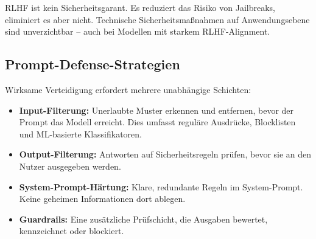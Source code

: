 \begin{merke}
RLHF ist kein Sicherheitsgarant. Es reduziert das Risiko von Jailbreaks, eliminiert es aber nicht. Technische Sicherheitsmaßnahmen auf Anwendungsebene sind unverzichtbar -- auch bei Modellen mit starkem RLHF-Alignment.
\end{merke}

\subsection{Prompt-Defense-Strategien}

Wirksame Verteidigung erfordert mehrere unabhängige Schichten:

\begin{itemize}[leftmargin=*]
    \item \textbf{Input-Filterung:} Unerlaubte Muster erkennen und entfernen, bevor der Prompt das Modell erreicht. Dies umfasst reguläre Ausdrücke, Blocklisten und ML-basierte Klassifikatoren.
    \item \textbf{Output-Filterung:} Antworten auf Sicherheitsregeln prüfen, bevor sie an den Nutzer ausgegeben werden.
    \item \textbf{System-Prompt-Härtung:} Klare, redundante Regeln im System-Prompt. Keine geheimen Informationen dort ablegen.
    \item \textbf{Guardrails:} Eine zusätzliche Prüfschicht, die Ausgaben bewertet, kennzeichnet oder blockiert.
\end{itemize}

